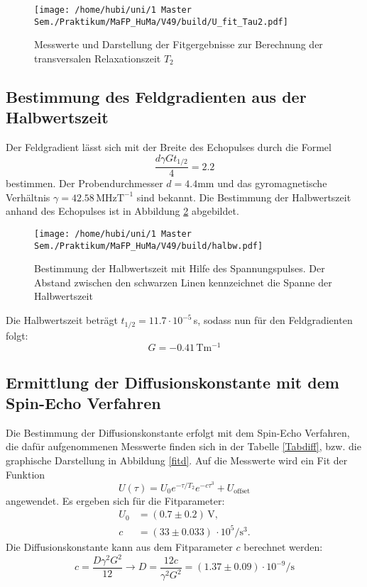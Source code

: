 \begin{figure}
\centering
\texttt{[image: /home/hubi/uni/1 Master Sem./Praktikum/MaFP\_HuMa/V49/build/U\_fit\_Tau2.pdf]}
\caption{Messwerte und Darstellung der Fitgergebnisse zur Berechnung
der transversalen Relaxationszeit $T_2$}
\label{fittau2}
\end{figure}


\subsection{Bestimmung des Feldgradienten aus der Halbwertszeit}
Der Feldgradient lässt sich mit der Breite des Echopulses
durch die Formel
$$ \frac{d \gamma G t_{1/2}}{4}=2.2$$
bestimmen. Der Probendurchmesser $d=4.4$mm und das gyromagnetische Verhältnis
$\gamma=42.58\,$MHz$\text{T}^{-1}$ sind bekannt. Die Bestimmung der
Halbwertszeit anhand des Echopulses ist in Abbildung \ref{halbw} abgebildet.

\begin{figure}[h]
\centering
\texttt{[image: /home/hubi/uni/1 Master Sem./Praktikum/MaFP\_HuMa/V49/build/halbw.pdf]}
\caption{Bestimmung der Halbwertszeit mit Hilfe des Spannungspulses. Der Abstand
zwischen den schwarzen Linen kennzeichnet die Spanne der Halbwertszeit}
\label{halbw}
\end{figure}
Die Halbwertszeit beträgt $t_{1/2}= 11.7\cdot 10^{-5}\,$s, sodass nun für den
Feldgradienten folgt:
$$G=-0.41\, \text{T}\text{m}^{-1}$$

\subsection{Ermittlung der Diffusionskonstante mit dem Spin-Echo Verfahren}
Die Bestimmung der Diffusionskonstante erfolgt mit dem Spin-Echo Verfahren,
die dafür aufgenommenen Messwerte finden sich in der Tabelle \ref{Tabdiff},
bzw. die graphische Darstellung in Abbildung \ref{fitd}. Auf
die Messwerte wird ein Fit der Funktion
$$U(\tau)=U_0 e^{-\tau / T_2}e^{-c\tau^3}+U_\text{offset}$$
angewendet. Es ergeben sich für die Fitparameter:
\begin{align*}
U_0&=(0.7 \pm 0.2 )\, \text{V},\\
c&= (33 \pm 0.033)\,\cdot 10^{5}/\text{s}^3.
\end{align*}
Die Diffusionskonstante kann aus dem Fitparameter $c$ berechnet werden:
$$c=\frac{D \gamma^2 G^2}{12} \rightarrow D=\frac{12c}{\gamma^2 G^2}= (1.37 \pm 0.09)\cdot 10^{-9}/\text{s}$$



